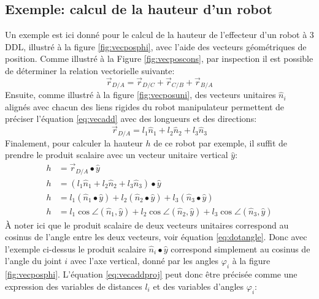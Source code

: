 \subsection{Exemple: calcul de la hauteur d'un robot}
\label{sec:hauteurrobot}
%
Un exemple est ici donné pour le calcul de la hauteur de l'effecteur d'un robot à 3 DDL, illustré à la figure \ref{fig:vecposphi}, avec l'aide des vecteurs géométriques de position. Comme illustré à la Figure \ref{fig:vecposcons}, par inspection il est possible de déterminer la relation vectorielle suivante:
\begin{equation}
	\vec{r}_{D/A} = \vec{r}_{D/C} + \vec{r}_{C/B} + \vec{r}_{B/A}
	\label{eq:vecadd}
\end{equation}
Ensuite, comme illustré à la figure \ref{fig:vecposuni}, des vecteurs unitaires $\hat{n}_i$ alignés avec chacun des liens rigides du robot manipulateur permettent de préciser l'équation \eqref{eq:vecadd} avec des longueurs et des directions:
\begin{equation}
	\vec{r}_{D/A} = l_1 \hat{n}_{1} + l_2 \hat{n}_{2} + l_3 \hat{n}_{3}
	\label{eq:vecadduni}
\end{equation}
Finalement, pour calculer la hauteur $h$ de ce robot par exemple, il suffit de prendre le produit scalaire avec un vecteur unitaire vertical $\hat{y}$:
\begin{align}
	h &= \vec{r}_{D/A} \bullet \hat{y} \\
	h &= ( l_1 \hat{n}_{1} + l_2 \hat{n}_{2} + l_3 \hat{n}_{3} ) \bullet \hat{y} \\
	h &= l_1 ( \hat{n}_{1} \bullet \hat{y} ) + l_2 ( \hat{n}_{2} \bullet \hat{y} ) + l_3 ( \hat{n}_{3}  \bullet \hat{y} ) \\
	h &= l_1 \cos \angle (\hat{n}_{1},\hat{y}) + l_2 \cos \angle (\hat{n}_{2},\hat{y}) + l_3 \cos \angle (\hat{n}_{3},\hat{y})
	\label{eq:vecaddproj}
\end{align}
À noter ici que le produit scalaire de deux vecteurs unitaires correspond au cosinus de l'angle entre les deux vecteurs, voir équation \eqref{eq:dotangle}. Donc avec l’exemple ci-dessus le produit scalaire $\hat{n}_{i} \bullet \hat{y}$ correspond simplement au cosinus de l'angle du joint $i$ avec l'axe vertical, donné par les angles $\varphi_i$ à la figure \ref{fig:vecposphi}. L'équation \eqref{eq:vecaddproj} peut donc être précisée comme une expression des variables de distances $l_i$ et des variables d'angles $\varphi_i$:
